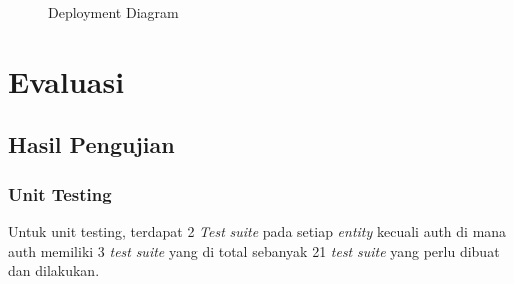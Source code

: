 \begin{figure}[h]
  {\par}
  \caption{Deployment Diagram}
  \label{deployment}
\end{figure}

\newpage

\section{Evaluasi}

\subsection{Hasil Pengujian}
\subsubsection{Unit Testing}
Untuk unit testing, terdapat 2 \textit{Test} \textit{suite} pada setiap \textit{entity} kecuali auth di mana auth memiliki 3 \textit{test} \textit{suite} yang di total sebanyak 21 \textit{test} \textit{suite} yang perlu dibuat dan dilakukan.

